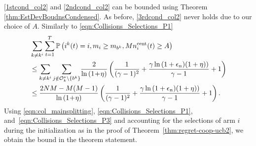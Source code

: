 \documentclass[final,5p,times,twocolumn]{elsarticle}
\theoremstyle{definition}
\def\prob{\mathbb{P}}
\newcommand{\lnn}[1]{%
	\ln  \left(#1\right)%
}
\begin{document}
	\eqref{1stcond_col2} and \eqref{2ndcond_col2} can be bounded using Theorem \ref{thm:EstDevBoudnsCondensed}. As before, \eqref{3rdcond_col2} never holds due to our choice of $A$.  Similarly to \eqref{eqn:Collisions_Selections_P1} %
%	
	\begin{align}
	&\sum_{k \neq k^i} \sum_{t=1}^{T} \prob \left( i^k(t) = i, m_i \geq m_{b^k}, Mn_i^{\text{cent}}(t) \geq A \right) \nonumber \\
		& \leq \sum_{k \neq k^i} \sum_{j \notin \mathcal{O}_{k}^* \setminus \{b^k\}} \! \frac{2}{\lnn{1\!+\!\eta}}   \left( \frac{1}{(\gamma - 1)^2} +  {\frac{\gamma \lnn{1 + \epsilon_n)(1 + \eta)}}{\gamma - 1} +1} \right)  \nonumber\\
				& \leq \frac{2NM -M(M-1)}{\lnn{1\!+\!\eta}}   \left( \frac{1}{(\gamma - 1)^2} +  {\frac{\gamma \lnn{1 + \epsilon_n)(1 + \eta)}}{\gamma - 1} +1} \right).  \label{eqn:Collisions_Selections_P3} 	
	\end{align}
Using \eqref{eqn:col_mainsplitting}, \eqref{eqn:Collisions_Selections_P1}, and~\eqref{eqn:Collisions_Selections_P3} and accounting for the selections of arm $i$ during the initialization as in the proof of Theorem~\ref{thm:regret-coop-ucb2}, we obtain the bound in the theorem statement. 
\end{document}
